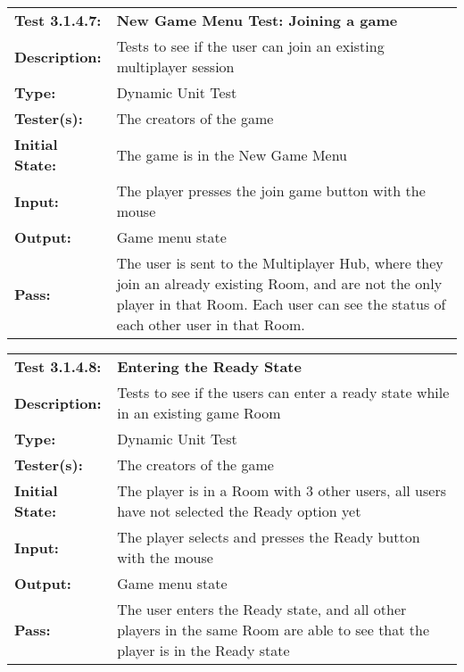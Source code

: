 \documentclass[12pt, titlepage]{article}
\begin{document}
\begin{mdframed}[linewidth=1pt]
\begin{tabularx}{\textwidth}{@{}p{3cm}X@{}}
{\bf Test 3.1.4.7:} & {\bf New Game Menu Test: Joining a game}\\[\baselineskip]
{\bf Description:} & Tests to see if the user can join an existing multiplayer session\\[0.5\baselineskip]
{\bf Type:} & Dynamic Unit Test\\[0.5\baselineskip]
{\bf Tester(s):} & The creators of the game\\[0.5\baselineskip]
{\bf Initial State:} & The game is in the New Game Menu\\[0.5\baselineskip]
{\bf Input:} & The player presses the join game button with the mouse \\[0.5\baselineskip]
{\bf Output:} & Game menu state\\[0.5\baselineskip]
{\bf Pass:} & The user is sent to the Multiplayer Hub, where they join an already existing Room, and are not the only player in that Room. Each user can see the status of each other user in that Room.
\end{tabularx}
\end{mdframed}

\begin{mdframed}[linewidth=1pt]
\begin{tabularx}{\textwidth}{@{}p{3cm}X@{}}
{\bf Test 3.1.4.8:} & {\bf Entering the Ready State}\\[\baselineskip]
{\bf Description:} & Tests to see if the users can enter a ready state while in an existing game Room\\[0.5\baselineskip]
{\bf Type:} & Dynamic Unit Test\\[0.5\baselineskip]
{\bf Tester(s):} & The creators of the game\\[0.5\baselineskip]
{\bf Initial State:} & The player is in a Room with 3 other users, all users have not selected the Ready option yet\\[0.5\baselineskip]
{\bf Input:} & The player selects and presses the Ready button with the mouse \\[0.5\baselineskip]
{\bf Output:} & Game menu state\\[0.5\baselineskip]
{\bf Pass:} & The user enters the Ready state, and all other players in the same Room are able to see that the player is in the Ready state
\end{tabularx}
\end{mdframed}
\end{document}
